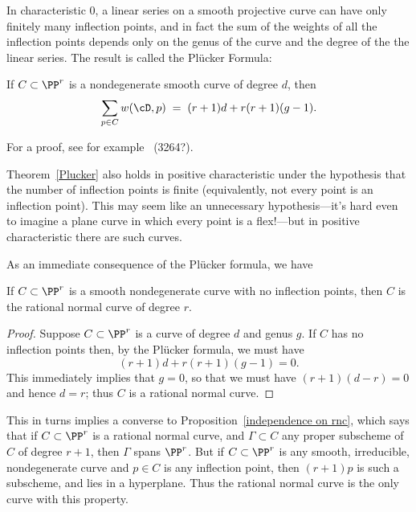 In characteristic 0, a linear series on a smooth projective curve can have only finitely many inflection points, and in fact the sum of the weights of all the inflection points depends only on the genus of the curve and the degree of the the linear series. The result is called the Pl\"ucker Formula:

\begin{theorem}\label{Plucker}
If $C \subset \PP^r$ is a nondegenerate smooth curve of degree $d$, then
 \begin{equation}\label{Plucker formula}
\sum_{p \in C} w(\cD, p) \; = \; (r+1)d + r(r+1)(g-1).
\end{equation}
\end{theorem}
For a proof, see for example~\cite{} (3264?). 

Theorem~\ref{Plucker} also holds in positive characteristic under the hypothesis that the number of inflection points is finite (equivalently, not every point is an inflection point). This may seem like an unnecessary hypothesis---it's hard even to imagine a plane curve in which every point is a flex!---but in positive characteristic there are such curves.

As an immediate consequence of the Pl\"ucker formula, we have

\begin{corollary}\label{uninflected curves}
 If $C\subset \PP^r$ is a smooth nondegenerate curve with no inflection points, then $C$ is the rational normal curve of degree $r$. 
\end{corollary}

\begin{proof}
Suppose $C \subset \PP^r$ is a curve of degree $d$ and genus $g$. If $C$ has no inflection points then, by the Pl\"ucker formula, we must have
$$
(r+1)d + r(r+1)(g-1) = 0.
$$
This immediately implies that $g=0$, so that we must have $(r+1)(d-r) = 0$ and hence $d=r$; thus $C$ is a rational normal curve.
\end{proof}

This in turns implies a converse to  Proposition~\ref{independence on rnc}, which says that if $C \subset \PP^r$ is a rational normal curve, and $\Gamma \subset C$ any proper subscheme of $C$ of degree $r+1$, then $\Gamma$ spans $\PP^r$. But if $C \subset \PP^r$ is any smooth, irreducible, nondegenerate curve and $p \in C$ is any inflection point, then $(r+1)p$ is such a subscheme, and lies in a hyperplane. Thus the rational normal curve is the only curve with this property.


